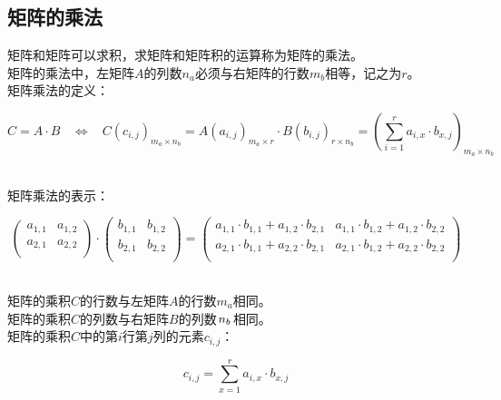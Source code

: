 \documentclass[UTF8]{ctexart}
\begin{document}
\subsection{矩阵的乘法}
    矩阵和矩阵可以求积，求矩阵和矩阵积的运算称为矩阵的乘法。\\[3mm]
    矩阵的乘法中，左矩阵$A$的列数$n_a$必须与右矩阵的行数$m_b$相等，记之为$r$。\\[3mm]
    矩阵乘法的定义：
    \begin{large}
        \begin{equation*}
            C=A\cdot B~~~~\Longleftrightarrow~~~~C(c_{i,j})_{m_a\times n_b}=A(a_{i,j})_{m_a\times r}\cdot B(b_{i,j})_{r\times n_b}=(\sum_{i=1}^r a_{i,x}\cdot b_{x,j})_{m_a\times n_b}
        \end{equation*}
    \end{large}\\
    矩阵乘法的表示：
    \begin{large}
        \begin{equation*}     
            \begin{pmatrix}
                a_{1,1}&a_{1,2}\\
                a_{2,1}&a_{2,2}\\
            \end{pmatrix}
            \cdot
            \begin{pmatrix}
                b_{1,1}&b_{1,2}\\
                b_{2,1}&b_{2,2}\\
            \end{pmatrix}
            =
            \begin{pmatrix}
                a_{1,1}\cdot b_{1,1}+a_{1,2}\cdot b_{2,1}&a_{1,1}\cdot b_{1,2}+a_{1,2}\cdot b_{2,2}\\
                a_{2,1}\cdot b_{1,1}+a_{2,2}\cdot b_{2,1}&a_{2,1}\cdot b_{1,2}+a_{2,2}\cdot b_{2,2}\\
            \end{pmatrix}
        \end{equation*}
    \end{large}\\[5mm]
    矩阵的乘积$C$的行数与左矩阵$A$的行数$m_a$相同。\\[3mm]
    矩阵的乘积$C$的列数与右矩阵$B$的列数$\hspace{1.0pt}n_b\hspace{1.0pt}$相同。\\[3mm]
    矩阵的乘积$C$中的第$i$行第$j$列的元素$c_{i,j}$：
    \begin{large}
        \begin{equation*}
            c_{i,j}=\sum_{x=1}^{r}a_{i,x}\cdot b_{x,j}
        \end{equation*}
    \end{large}\\
\end{document}
